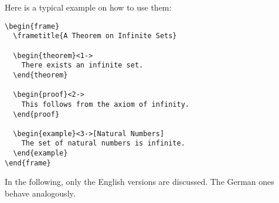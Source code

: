Here is a typical example on how to use them:

\begin{verbatim}
\begin{frame}
  \frametitle{A Theorem on Infinite Sets}

  \begin{theorem}<1->
    There exists an infinite set.
  \end{theorem}

  \begin{proof}<2->
    This follows from the axiom of infinity.
  \end{proof}

  \begin{example}<3->[Natural Numbers]
    The set of natural numbers is infinite.
  \end{example}
\end{frame}
\end{verbatim}

In the following, only the English versions are discussed. The German
ones behave  analogously.

